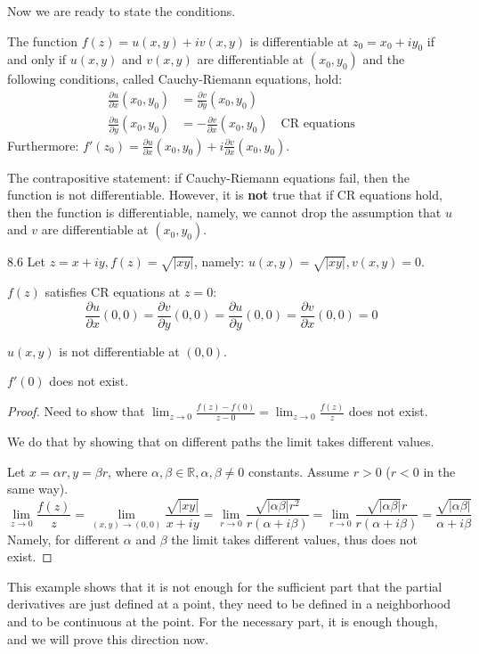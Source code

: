 Now we are ready to state the conditions.
\begin{theorem}\label{theorem:6.1}
    The function $f(z) = u(x,y) + iv(x,y)$ is differentiable at $z_0 = x_0 + iy_0$ if and only if $u(x,y)$ and $v(x,y)$ are differentiable at $(x_0, y_0)$ and the following conditions, called Cauchy-Riemann equations, hold:
\begin{align*}
\frac{\partial u}{\partial x}(x_0, y_0) &= \frac{\partial v}{\partial y}(x_0, y_0) \\
\frac{\partial u}{\partial y}(x_0, y_0) &= -\frac{\partial v}{\partial x}(x_0, y_0) \quad \text{CR equations}
\end{align*}
Furthermore: $f'(z_0) = \frac{\partial u}{\partial x}(x_0, y_0) + i\frac{\partial v}{\partial x}(x_0, y_0)$.
\end{theorem}
The contrapositive statement: if Cauchy-Riemann equations fail, then the function is not differentiable.
However, it is \textbf{not} true that if CR equations hold, then the function is differentiable, namely, we cannot drop the assumption that $u$ and $v$ are differentiable at $(x_0, y_0)$.

\begin{example}\label{example:8.6} 8.6 Let $z = x+iy, f(z) = \sqrt{|xy|}$, namely: $u(x,y) = \sqrt{|xy|}, v(x,y) = 0$.

    \checkthis{} $f(z)$ satisfies CR equations at $z=0$:
\[ \frac{\partial u}{\partial x}(0,0) = \frac{\partial v}{\partial y}(0,0) = \frac{\partial u}{\partial y}(0,0) = \frac{\partial v}{\partial x}(0,0) = 0 \]

\checkthis{} $u(x,y)$ is not differentiable at $(0,0)$.
\end{example}

\begin{claim} $f'(0)$ does not exist.
\begin{proof} Need to show that $\lim_{z\to 0} \frac{f(z) - f(0)}{z-0} = \lim_{z\to 0} \frac{f(z)}{z}$ does not exist.

We do that by showing that on different paths the limit takes different values.

Let $x = \alpha r, y = \beta r$, where $\alpha, \beta \in \mathbb{R}, \alpha, \beta \neq 0$ constants. Assume $r > 0$ ($r < 0$ in the same way).
\[ \lim_{z \to 0} \frac{f(z)}{z} = \lim_{(x,y) \to (0,0)} \frac{\sqrt{|xy|}}{x + iy} = \lim_{r \to 0} \frac{\sqrt{|\alpha \beta|r^2}}{r(\alpha + i\beta)} = \lim_{r \to 0} \frac{\sqrt{|\alpha \beta|}r}{r(\alpha + i\beta)} = \frac{\sqrt{|\alpha \beta|}}{\alpha + i\beta} \]
Namely, for different $\alpha$ and $\beta$ the limit takes different values, thus does not exist.
\end{proof}
\end{claim}
This example shows that it is not enough for the sufficient part that the partial derivatives are just defined at a point, they need to be defined in a neighborhood and to be continuous at the point. For the necessary part, it is enough though, and we will prove this direction now.

